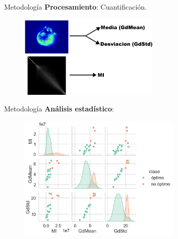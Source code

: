 \documentclass{beamer}
\begin{document}
\begin{frame}{Metodología}
    \textbf{Procesamiento}: Cuantificación.
    \begin{figure}
        \includegraphics[width=0.6\textwidth]{numeros.png}
    \end{figure}
\end{frame}

\begin{frame}{Metodología}
    \textbf{Análisis estadístico}: 
    \begin{figure}
        \includegraphics[width=0.7\textwidth]{pairplot.png}
    \end{figure}

\end{frame}
\end{document}
